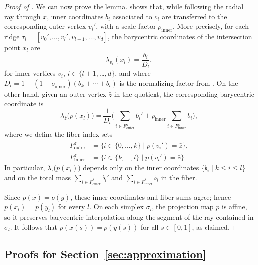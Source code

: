 \documentclass[a4paper,english,cleveref,autoref,thm-restate,nolineno]{socg-lipics-v2021}
\begin{document}
\begin{proof}[Proof of ]
		
	We can now prove the lemma.
	 shows that, while following the radial ray through $x$, inner coordinates $b_i$ associated to $v_i$ are transferred to the corresponding outer vertex $v_i'$, with a scale factor $\rho_\mathrm{inner}$.
	More precisely, for each ridge $\tau_l=[v_0',\dots,v_l',v_{l+1},\dots,v_d]$, the barycentric coordinates of the intersection point $x_l$ are
	\[
	\lambda_{v_i}(x_l)=\frac{b_i}{D_l},
	\]
	for inner vertices $v_i$, $i\in\{l+1,\dots,d\}$, and where $D_l=1-(1-\rho_{\mathrm{inner}})(b_k+\cdots+b_l)$ is the normalizing factor from
	.
	On the other hand, given an outer vertex $\bar z$ in the quotient, the corresponding barycentric coordinate is
	\[
	\lambda_{\bar z}\big(p(x_l)\big)
	=\frac{1}{D_l}\bigg(
	\sum_{i\in F^{\bar z}_\mathrm{outer}} b_i' 
	+
	\rho_{\mathrm{inner}} \sum_{i\in F^{\bar z}_\mathrm{inner}}  b_i
	\bigg),
	\]
	where we define the fiber index sets
	\begin{align*}
		F^{\bar z}_\mathrm{outer} &= \{i \in \{0,\dots,k\}\mid p(v_i') = \bar z \},\\
		F^{\bar z}_\mathrm{inner} &= \{i \in \{k,\dots,l\}\mid p(v_i') = \bar z \}.
	\end{align*}
	In particular, $\lambda_{\bar z}\big(p(x_l)\big)$ depends only on the inner coordinates $\{b_i\mid k\leq i\leq l\}$ and on the total mass
	$\sum_{i\in F^{\bar z}_\mathrm{outer}} b_i'$ and $\sum_{i\in F^{\bar z}_\mathrm{inner}} b_i$ in the fiber.
		
	Since $p(x)=p(y)$, these inner coordinates and fiber-sums agree; hence $p(x_l)=p(y_l)$ for every $l$.
	On each simplex $\sigma_l$, the projection map $p$ is affine, so it preserves barycentric
	interpolation along the segment of the ray contained in $\sigma_l$.
	It follows that $p(x(s))=p(y(s))$ for all $s\in[0,1]$, as claimed.
\end{proof}

\subsection{Proofs for Section~\ref*{sec:approximation}}

\lecdatagluing*
\end{document}
